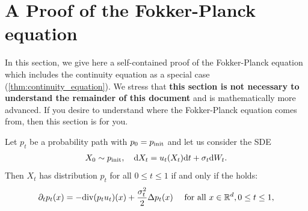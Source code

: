 \section{A Proof of the Fokker-Planck equation}
\label{subsec:proof_fokker_planck}
In this section, we give here a self-contained proof of the Fokker-Planck equation which includes the continuity equation as a special case (\cref{thm:continuity_equation}). We stress that \textbf{this section is not necessary to understand the remainder of this document} and is mathematically more advanced. If you desire to understand where the Fokker-Planck equation comes from, then this section is for you.\\

\begin{theorem}
\label{thm:fokker_planck_restated}
Let $p_t$ be a probability path with $p_0=p_{\rm{init}}$ and let us consider the SDE
\begin{align*}
    X_0\sim p_{\rm{init}}, \quad \mathrm{d} X_t = u_t(X_t)\mathrm{d} t + \sigma_t\mathrm{d} W_t.
\end{align*}
Then $X_t$ has distribution $p_t$ for all $0\leq t\leq 1$ if and only if the  holds:
    \begin{align}
    \label{e:fokker_planck_restated}
    \partial_t p_t(x) = -\mathrm{div} (p_t u_t)(x)+\frac{\sigma_t^2}{2}\Delta p_t (x)\quad \text{ for all }x\in\mathbb{R}^d, 0\leq t\leq 1,
    \end{align}     
\end{theorem}

